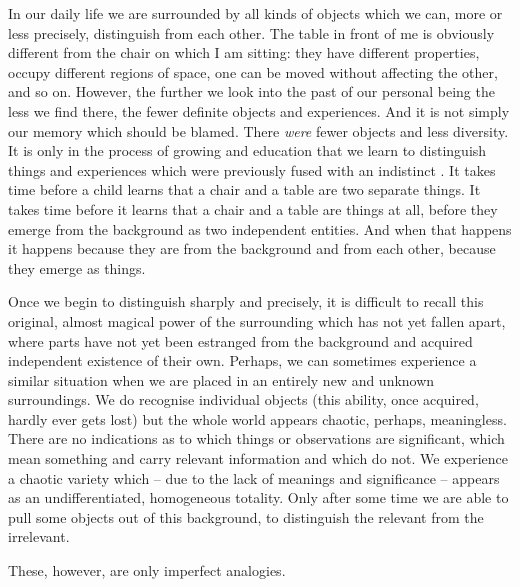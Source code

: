 In our daily life we are surrounded by all kinds of objects which we can, more
or less precisely, distinguish from each other.  The table in front of me is
obviously different from the chair on which I am sitting: they have different
properties, occupy different regions of space, one can be moved without
affecting the other, and so on.  However, the further we look into the past of
our personal being the less we find there, the fewer definite objects and
experiences.  And it is not simply our memory which should be blamed.  There
{\em were} fewer objects and less diversity.  It is only in the process of
growing and education that we learn to distinguish things and experiences which
were previously fused with an indistinct .  It takes time before
a child learns that a chair and a table are two separate things.  It takes time
before it learns that a chair and a table are things at all, before they emerge
from the  background as two independent entities.  And when that
happens it happens because they are  from the background and
from each other, because they emerge as  things.

Once we begin to distinguish sharply and precisely, it is difficult to recall
this original, almost magical power of the surrounding which has not yet fallen
apart, where parts have not yet been estranged from the background and acquired
independent existence of their own.  Perhaps,
we can sometimes experience a similar situation when we are placed in an
entirely new and unknown surroundings.  We do recognise individual objects (this
ability, once acquired, hardly ever gets lost) but the whole world appears
chaotic, perhaps, meaningless.  There are no indications as to which things or
observations are significant, which mean something and carry relevant
information and which do not.  We experience a chaotic variety which -- due to
the lack of meanings and significance -- appears as an undifferentiated,
homogeneous totality.  Only after some time we are able to pull some objects out
of this background, to distinguish the relevant from the irrelevant.

These, however, are only imperfect analogies.



